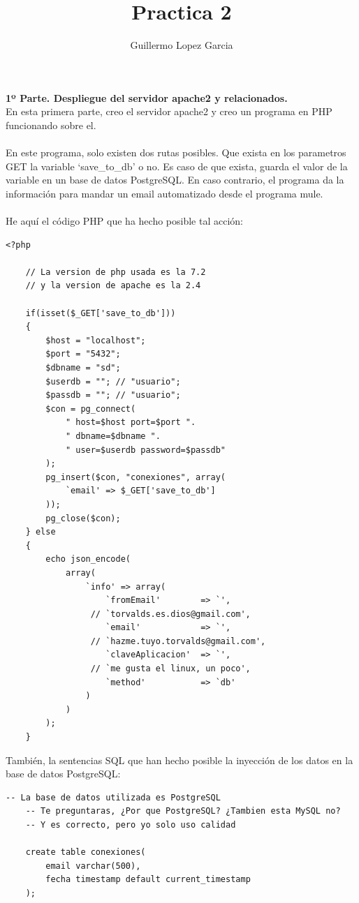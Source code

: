 \documentclass{article}
\title{Practica 2}
\author{Guillermo Lopez Garcia}
\begin{document}
\textbf{1º Parte. Despliegue del servidor apache2 y relacionados.}\\
En esta primera parte, creo el servidor apache2 y creo un programa
en PHP funcionando sobre el.\\
\\
En este programa, solo existen dos rutas posibles. Que exista en los
parametros GET la variable `save\_to\_db' o no. Es caso de que exista,
guarda el valor de la variable en un base de datos PostgreSQL\@. En caso
contrario, el programa da la información para mandar un email
automatizado desde el programa mule.\\
\\
He aquí el código PHP que ha hecho posible tal acción:\\

\lstset{language=PHP, texcl=true}
\begin{lstlisting}[frame=single]
    <?php

    // La version de php usada es la 7.2
    // y la version de apache es la 2.4

    if(isset($_GET['save_to_db']))
    {
        $host = "localhost";
        $port = "5432";
        $dbname = "sd";
        $userdb = ""; // "usuario";
        $passdb = ""; // "usuario";
        $con = pg_connect(
            " host=$host port=$port ".
            " dbname=$dbname ".
            " user=$userdb password=$passdb"
        );
        pg_insert($con, "conexiones", array(
            `email' => $_GET['save_to_db']
        ));
        pg_close($con);
    } else
    {
        echo json_encode(
            array(
                `info' => array(
                    `fromEmail'        => `',
                 // `torvalds.es.dios@gmail.com',
                    `email'            => `',
                 // `hazme.tuyo.torvalds@gmail.com',
                    `claveAplicacion'  => `',
                 // `me gusta el linux, un poco',
                    `method'           => `db'
                )
            )
        );
    }
\end{lstlisting}

También, la sentencias SQL que han hecho posible la
inyección de los datos en la base de datos PostgreSQL:\\

\lstset{language=SQL, texcl=true}
\begin{lstlisting}[frame=single]
    -- La base de datos utilizada es PostgreSQL
    -- Te preguntaras, ¿Por que PostgreSQL? ¿Tambien esta MySQL no?
    -- Y es correcto, pero yo solo uso calidad
    
    create table conexiones(
        email varchar(500),
        fecha timestamp default current_timestamp
    );
\end{lstlisting}
\end{document}
